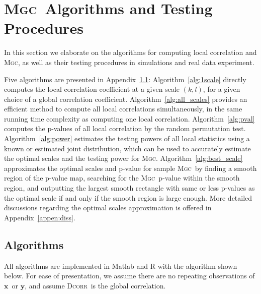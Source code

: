 \documentclass[11pt]{article}
\providecommand{\sct}[1]{{\normalfont\textsc{#1}}}
\providecommand{\mb}[1]{\boldsymbol{#1}}
\newcommand{\Mgc}{\sct{Mgc}}
\newcommand{\Dcorr}{\sct{Dcorr}}
\newcommand{\mbx}{\ensuremath{\mb{x}}}
\newcommand{\mby}{\ensuremath{\mb{y}}}
\begin{document}

\section{\Mgc~Algorithms and Testing Procedures}
\label{appen:tests}
In this section we elaborate on the algorithms for computing local correlation and \Mgc, as well as their testing procedures in simulations and real data experiment.

Five algorithms are presented in Appendix~\ref{appen:algorithms}: Algorithm~\ref{alg:1scale} directly computes the local correlation coefficient at a given scale $(k,l)$, for a given choice of a global correlation coefficient.
Algorithm~\ref{alg:all_scales} provides an efficient method to compute all local correlations simultaneously, in the same running time complexity as computing one local correlation. Algorithm~\ref{alg:pval} computes the p-values of all local correlation by the random permutation test. 
Algorithm~\ref{alg:power} estimates the testing powers of all local statistics using a known or estimated joint distribution, which can be used to accurately estimate the optimal scales and the testing power for \Mgc. 
Algorithm~\ref{alg:best_scale} approximates the optimal scales and p-value for sample \Mgc~by finding a smooth region of the p-value map, searching for the \Mgc~p-value within the smooth region, and outputting the largest smooth rectangle with same or less p-values as the optimal scale if and only if the smooth region is large enough. More detailed discussions regarding the optimal scales approximation is offered in Appendix~\ref{appen:diss}.

\subsection{Algorithms}
\label{appen:algorithms}
All algorithms are implemented in Matlab and R with the algorithm shown below. For ease of presentation, we assume there are no repeating observations of \mbx~or \mby, and assume \Dcorr~is the global correlation.
\end{document}
